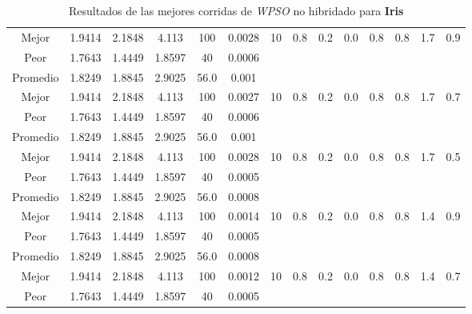 \begin{table}[h!]
\begin{center}
\begin{tabular}{|c|c|c|c|c|c|c|c|c|c|c|c|c|c|}
            \cline{1-6}
            Mejor & 1.9414 & 2.1848  & 4.113 & 100 & 0.0028 & 10 & 0.8 & 0.2 & 0.0 & 0.8 & 0.8 & 1.7 & 0.9\\
            \cline{1-6}
            Peor & 1.7643 & 1.4449  & 1.8597 & 40 & 0.0006 &  &  &  &  &  &  &  & \\
        \hline
        \hline
            Promedio  & 1.8249 & 1.8845 & 2.9025 & 56.0 & 0.001 &  &  &  &  &  &  &  & \\
            \cline{1-6}
            Mejor & 1.9414 & 2.1848  & 4.113 & 100 & 0.0027 & 10 & 0.8 & 0.2 & 0.0 & 0.8 & 0.8 & 1.7 & 0.7\\
            \cline{1-6}
            Peor & 1.7643 & 1.4449  & 1.8597 & 40 & 0.0006 &  &  &  &  &  &  &  & \\
        \hline
        \hline
            Promedio  & 1.8249 & 1.8845 & 2.9025 & 56.0 & 0.001 &  &  &  &  &  &  &  & \\
            \cline{1-6}
            Mejor & 1.9414 & 2.1848  & 4.113 & 100 & 0.0028 & 10 & 0.8 & 0.2 & 0.0 & 0.8 & 0.8 & 1.7 & 0.5\\
            \cline{1-6}
            Peor & 1.7643 & 1.4449  & 1.8597 & 40 & 0.0005 &  &  &  &  &  &  &  & \\
        \hline
        \hline
            Promedio  & 1.8249 & 1.8845 & 2.9025 & 56.0 & 0.0008 &  &  &  &  &  &  &  & \\
            \cline{1-6}
            Mejor & 1.9414 & 2.1848  & 4.113 & 100 & 0.0014 & 10 & 0.8 & 0.2 & 0.0 & 0.8 & 0.8 & 1.4 & 0.9\\
            \cline{1-6}
            Peor & 1.7643 & 1.4449  & 1.8597 & 40 & 0.0005 &  &  &  &  &  &  &  & \\
        \hline
        \hline
            Promedio  & 1.8249 & 1.8845 & 2.9025 & 56.0 & 0.0008 &  &  &  &  &  &  &  & \\
            \cline{1-6}
            Mejor & 1.9414 & 2.1848  & 4.113 & 100 & 0.0012 & 10 & 0.8 & 0.2 & 0.0 & 0.8 & 0.8 & 1.4 & 0.7\\
            \cline{1-6}
            Peor & 1.7643 & 1.4449  & 1.8597 & 40 & 0.0005 &  &  &  &  &  &  &  & \\
        \hline
        \end{tabular}
        \caption{Resultados de las mejores corridas de \emph{WPSO} no hibridado para {\bf Iris}}
        \label{tb:tablewpsoalgcsv}
    \end{center}
\end{table}


